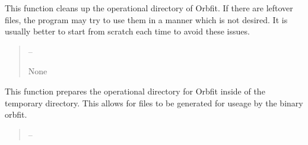 \documentclass[letterpaper,11pt,english]{sphinxmanual}
\begin{document}
\begin{savenotes}
\begin{fulllineitems}

\begin{savenotes}\begin{fulllineitems}
\label{\detokenize{code/opihiexarata.orbit.orbfit:opihiexarata.orbit.orbfit.OrbfitOrbitDeterminerEngine._clean_orbfit_files}}
\pysigstartsignatures
{}
\pysigstopsignatures
\sphinxAtStartPar
This function cleans up the operational directory of Orbfit.
If there are leftover files, the program may try to use them in a
manner which is not desired. It is usually better to start from
scratch each time to avoid these issues.
\begin{quote}\begin{description}
\sphinxAtStartPar
{} – 

\sphinxAtStartPar
None

\end{description}\end{quote}

\end{fulllineitems}\end{savenotes}


\begin{savenotes}\begin{fulllineitems}
\label{\detokenize{code/opihiexarata.orbit.orbfit:opihiexarata.orbit.orbfit.OrbfitOrbitDeterminerEngine._prepare_orbfit_files}}
\pysigstartsignatures
{}
\pysigstopsignatures
\sphinxAtStartPar
This function prepares the operational directory for Orbfit inside
of the temporary directory. This allows for files to be generated for
useage by the binary orbfit.
\begin{quote}\begin{description}
\sphinxAtStartPar
{} – 


\end{description}
\end{quote}
\end{fulllineitems}
\end{savenotes}
\end{fulllineitems}
\end{savenotes}
\end{document}
